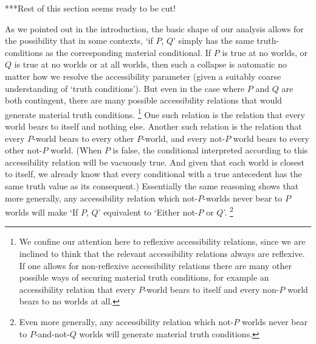 \documentclass[If.tex]{subfiles}
\begin{document}
\begin{prop}
***Rest of this section seems ready to be cut!
 
As we pointed out in the introduction, the basic shape of our analysis allows for the possibility that in some contexts, ‘if $P$, $Q$’ simply has the same truth-conditions as the corresponding material conditional.  If $P$ is true at no worlds, or $Q$ is true at no worlds or at all worlds, then such a collapse is automatic no matter how we resolve the accessibility parameter (given a suitably coarse understanding of ‘truth conditions’).  But even in the case where $P$ and $Q$ are both contingent, there are many possible accessibility relations that would generate material truth conditions.%
\footnote{We confine our attention here to reflexive accessibility relations, since we are inclined to think that the relevant accessibility relations always are reflexive.  If one allows for non-reflexive accessibility relations there are many other possible ways of securing material truth conditions, for example an accessibility relation that every $P$-world bears to itself and every non-$P$ world bears to no worlds at all.}  
One such relation is the relation that every world bears to itself and nothing else.  Another such relation is the relation that every $P$-world bears to every other $P$-world, and every not-$P$ world bears to every other not-$P$ world.  (When $P$ is false, the conditional interpreted according to this accessibility relation will be vacuously true.  And given that each world is closest to itself, we already know that every conditional with a true antecedent has the same truth value as its consequent.)  Essentially the same reasoning shows that more generally, any accessibility relation which not-$P$-worlds never bear to $P$ worlds will make ‘If $P$, $Q$’ equivalent to ‘Either not-$P$ or $Q$’.%
\footnote{Even more generally, any accessibility relation which not-$P$ worlds never bear to $P$-and-not-$Q$ worlds will generate material truth conditions.  }  


\end{prop}
\end{document}
